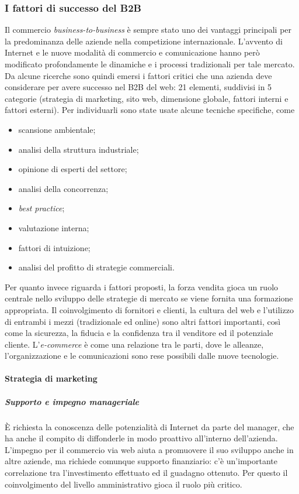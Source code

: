\subsubsection{I fattori di successo del B2B}
Il commercio \textit{business-to-business} è sempre stato uno dei vantaggi principali per la predominanza delle aziende nella competizione internazionale. L'avvento di Internet e le nuove modalità di commercio e comunicazione hanno però modificato profondamente le dinamiche e i processi tradizionali per tale mercato. Da alcune ricerche sono quindi emersi i fattori critici che una azienda deve considerare per avere successo nel B2B del web: 21 elementi, suddivisi in 5 categorie (strategia di marketing, sito web, dimensione globale, fattori interni e fattori esterni). Per individuarli sono state usate alcune tecniche specifiche, come
\begin{itemize}
	\item scansione ambientale;
	\item analisi della struttura industriale;
	\item opinione di esperti del settore;
	\item analisi della concorrenza;
	\item \textit{best practice};
	\item valutazione interna;
	\item fattori di intuizione;
	\item analisi del profitto di strategie commerciali.
\end{itemize}
Per quanto invece riguarda i fattori proposti, la forza vendita gioca un ruolo centrale nello sviluppo delle strategie di mercato se viene fornita una formazione appropriata. Il coinvolgimento di fornitori e clienti, la cultura del web e l'utilizzo di entrambi i mezzi (tradizionale ed online) sono altri fattori importanti, così come la sicurezza, la fiducia e la confidenza tra il venditore ed il potenziale cliente. L'\textit{e-commerce} è come una relazione tra le parti, dove le alleanze, l'organizzazione e le comunicazioni sono rese possibili dalle nuove tecnologie.

\paragraph{Strategia di marketing}
\subparagraph{Supporto e impegno manageriale}
È richiesta la conoscenza delle potenzialità di Internet da parte del manager, che ha anche il compito di diffonderle in modo proattivo all'interno dell'azienda. L'impegno per il commercio via web aiuta a promuovere il suo sviluppo anche in altre aziende, ma richiede comunque supporto finanziario: c'è un'importante correlazione tra l'investimento effettuato ed il guadagno ottenuto. Per questo il coinvolgimento del livello amministrativo gioca il ruolo più critico.

